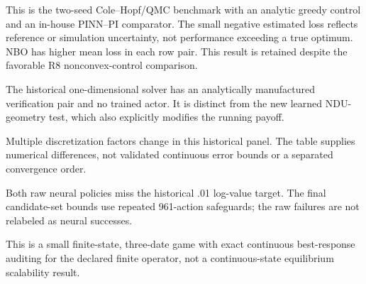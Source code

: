 \documentclass[ecta]{econsocart}
\renewcommand{\[}{\begingroup\small\ROpenDisplay}
\renewcommand{\]}{\RCloseDisplay\endgroup}
\theoremstyle{remark}
\begin{document}
\begin{table}[htbp]\centering\small
\caption{Retained R5 quadratic-control comparison}

\par\smallskip\footnotesize This is the two-seed Cole--Hopf/QMC benchmark with an analytic greedy control and an in-house PINN--PI comparator. The small negative estimated loss reflects reference or simulation uncertainty, not performance exceeding a true optimum. NBO has higher mean loss in each row pair. This result is retained despite the favorable R8 nonconvex-control comparison.
\end{table}

\begin{table}[htbp]\centering\small
\caption{Retained R5 manufactured stopped-diffusion test}

\par\smallskip\footnotesize The historical one-dimensional solver has an analytically manufactured verification pair and no trained actor. It is distinct from the new learned NDU-geometry test, which also explicitly modifies the running payoff.
\end{table}

\begin{table}[htbp]\centering\small
\caption{Retained R5 coupled NDU refinements}

\par\smallskip\footnotesize Multiple discretization factors change in this historical panel. The table supplies numerical differences, not validated continuous error bounds or a separated convergence order.
\end{table}

\begin{table}[htbp]\centering\small
\caption{Retained R5 recursive-utility policies}

\par\smallskip\footnotesize Both raw neural policies miss the historical .01 log-value target. The final candidate-set bounds use repeated 961-action safeguards; the raw failures are not relabeled as neural successes.
\end{table}

\begin{table}[htbp]\centering\small
\caption{Retained R5 neural game}

\par\smallskip\footnotesize This is a small finite-state, three-date game with exact continuous best-response auditing for the declared finite operator, not a continuous-state equilibrium scalability result.
\end{table}
\clearpage
\clearpage

\end{document}
